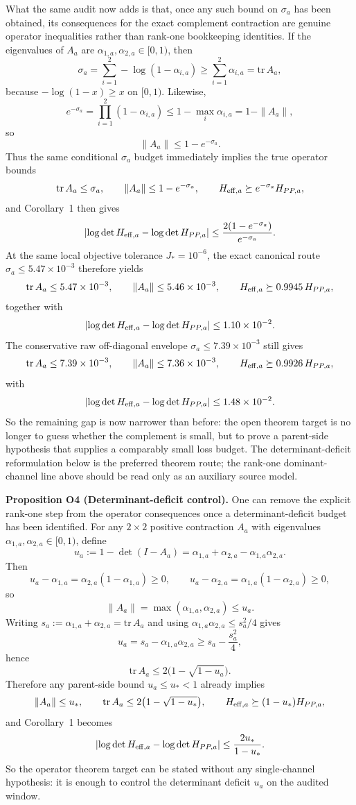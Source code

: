 \documentclass[aps,prd,onecolumn,notitlepage,nofootinbib,superscriptaddress,11pt,floatfix]{revtex4-2}
\begin{document}
What the same audit now adds is that, once any such bound on $\sigma_a$ has been obtained, its consequences for the exact complement contraction are genuine operator inequalities rather than rank-one bookkeeping identities. If the eigenvalues of $A_a$ are $\alpha_{1,a},\alpha_{2,a}\in[0,1)$, then
\[
\sigma_a
=
\sum_{i=1}^2 -\log(1-\alpha_{i,a})
\ge
\sum_{i=1}^2 \alpha_{i,a}
=
\mathrm{tr}\,A_a,
\]
because $-\log(1-x)\ge x$ on $[0,1)$. Likewise,
\[
e^{-\sigma_a}
=
\prod_{i=1}^2 (1-\alpha_{i,a})
\le
1-\max_i \alpha_{i,a}
=
1-\|A_a\|,
\]
so
\[
\|A_a\|
\le
1-e^{-\sigma_a}.
\]
Thus the same conditional $\sigma_a$ budget immediately implies the true operator bounds
\[
\mathrm{tr}\,A_a\le \sigma_a,
\qquad
\|A_a\|\le 1-e^{-\sigma_a},
\qquad
H_{{\rm eff},a}\succeq e^{-\sigma_a}H_{PP,a},
\]
and Corollary~1 then gives
\[
\left|\log\det H_{{\rm eff},a}-\log\det H_{PP,a}\right|
\le
\frac{2(1-e^{-\sigma_a})}{e^{-\sigma_a}}.
\]
At the same local objective tolerance $J_\ast=10^{-6}$, the exact canonical route $\sigma_a\le 5.47\times10^{-3}$ therefore yields
\[
\mathrm{tr}\,A_a\le 5.47\times10^{-3},
\qquad
\|A_a\|\le 5.46\times10^{-3},
\qquad
H_{{\rm eff},a}\succeq 0.9945\,H_{PP,a},
\]
together with
\[
\left|\log\det H_{{\rm eff},a}-\log\det H_{PP,a}\right|
\le 1.10\times10^{-2}.
\]
The conservative raw off-diagonal envelope $\sigma_a\le 7.39\times10^{-3}$ still gives
\[
\mathrm{tr}\,A_a\le 7.39\times10^{-3},
\qquad
\|A_a\|\le 7.36\times10^{-3},
\qquad
H_{{\rm eff},a}\succeq 0.9926\,H_{PP,a},
\]
with
\[
\left|\log\det H_{{\rm eff},a}-\log\det H_{PP,a}\right|
\le 1.48\times10^{-2}.
\]
So the remaining gap is now narrower than before: the open theorem target is no longer to guess whether the complement is small, but to prove a parent-side hypothesis that supplies a comparably small loss budget. The determinant-deficit reformulation below is the preferred theorem route; the rank-one dominant-channel line above should be read only as an auxiliary source model.

\medskip\noindent\textbf{Proposition O4 (Determinant-deficit control).}
One can remove the explicit rank-one step from the operator consequences once a determinant-deficit budget has been identified. For any $2\times 2$ positive contraction $A_a$ with eigenvalues $\alpha_{1,a},\alpha_{2,a}\in[0,1)$, define
\[
u_a:=1-\det(I-A_a)=\alpha_{1,a}+\alpha_{2,a}-\alpha_{1,a}\alpha_{2,a}.
\]
Then
\[
u_a-\alpha_{1,a}=\alpha_{2,a}(1-\alpha_{1,a})\ge 0,
\qquad
u_a-\alpha_{2,a}=\alpha_{1,a}(1-\alpha_{2,a})\ge 0,
\]
so
\[
\|A_a\|=\max(\alpha_{1,a},\alpha_{2,a})\le u_a.
\]
Writing $s_a:=\alpha_{1,a}+\alpha_{2,a}=\mathrm{tr}\,A_a$ and using $\alpha_{1,a}\alpha_{2,a}\le s_a^2/4$ gives
\[
u_a=s_a-\alpha_{1,a}\alpha_{2,a}\ge s_a-\frac{s_a^2}{4},
\]
hence
\[
\mathrm{tr}\,A_a\le 2\bigl(1-\sqrt{1-u_a}\bigr).
\]
Therefore any parent-side bound $u_a\le u_\ast<1$ already implies
\[
\|A_a\|\le u_\ast,
\qquad
\mathrm{tr}\,A_a\le 2\bigl(1-\sqrt{1-u_\ast}\bigr),
\qquad
H_{{\rm eff},a}\succeq (1-u_\ast)H_{PP,a},
\]
and Corollary~1 becomes
\[
\left|\log\det H_{{\rm eff},a}-\log\det H_{PP,a}\right|
\le
\frac{2u_\ast}{1-u_\ast}.
\]
So the operator theorem target can be stated without any single-channel hypothesis: it is enough to control the determinant deficit $u_a$ on the audited window.
\end{document}
